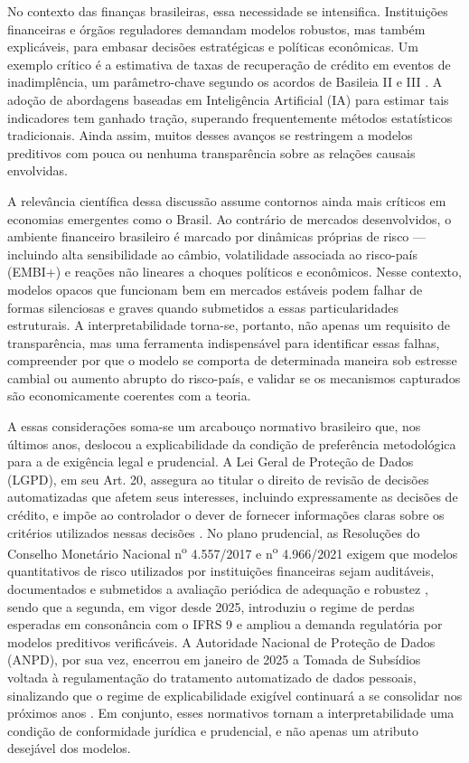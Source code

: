 \documentclass[	12pt, Times, openright, oneside, a4paper, english, brazil]{abntex2}
\begin{document}
No contexto das finanças brasileiras, essa necessidade se intensifica. Instituições financeiras e órgãos reguladores demandam modelos robustos, mas também explicáveis, para embasar decisões estratégicas e políticas econômicas. Um exemplo crítico é a estimativa de taxas de recuperação de crédito em eventos de inadimplência, um parâmetro-chave segundo os acordos de Basileia II e III \cite{NAZEMI2024107187}. A adoção de abordagens baseadas em Inteligência Artificial (IA) para estimar tais indicadores tem ganhado tração, superando frequentemente métodos estatísticos tradicionais. Ainda assim, muitos desses avanços se restringem a modelos preditivos com pouca ou nenhuma transparência sobre as relações causais envolvidas.

A relevância científica dessa discussão assume contornos ainda mais críticos em economias emergentes como o Brasil. Ao contrário de mercados desenvolvidos, o ambiente financeiro brasileiro é marcado por dinâmicas próprias de risco — incluindo alta sensibilidade ao câmbio, volatilidade associada ao risco-país (EMBI+) e reações não lineares a choques políticos e econômicos. Nesse contexto, modelos opacos que funcionam bem em mercados estáveis podem falhar de formas silenciosas e graves quando submetidos a essas particularidades estruturais. A interpretabilidade torna-se, portanto, não apenas um requisito de transparência, mas uma ferramenta indispensável para identificar essas falhas, compreender por que o modelo se comporta de determinada maneira sob estresse cambial ou aumento abrupto do risco-país, e validar se os mecanismos capturados são economicamente coerentes com a teoria.

A essas considerações soma-se um arcabouço normativo brasileiro que, nos últimos anos, deslocou a explicabilidade da condição de preferência metodológica para a de exigência legal e prudencial. A Lei Geral de Proteção de Dados (LGPD), em seu Art. 20, assegura ao titular o direito de revisão de decisões automatizadas que afetem seus interesses, incluindo expressamente as decisões de crédito, e impõe ao controlador o dever de fornecer informações claras sobre os critérios utilizados nessas decisões \cite{brasil2018lgpd}. No plano prudencial, as Resoluções do Conselho Monetário Nacional n\textsuperscript{o} 4.557/2017 e n\textsuperscript{o} 4.966/2021 exigem que modelos quantitativos de risco utilizados por instituições financeiras sejam auditáveis, documentados e submetidos a avaliação periódica de adequação e robustez \cite{bcb2017res4557, bcb2021res4966}, sendo que a segunda, em vigor desde 2025, introduziu o regime de perdas esperadas em consonância com o IFRS 9 e ampliou a demanda regulatória por modelos preditivos verificáveis. A Autoridade Nacional de Proteção de Dados (ANPD), por sua vez, encerrou em janeiro de 2025 a Tomada de Subsídios voltada à regulamentação do tratamento automatizado de dados pessoais, sinalizando que o regime de explicabilidade exigível continuará a se consolidar nos próximos anos \cite{anpd2025nt12}. Em conjunto, esses normativos tornam a interpretabilidade uma condição de conformidade jurídica e prudencial, e não apenas um atributo desejável dos modelos.
\end{document}
